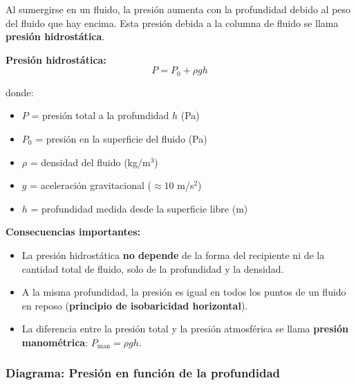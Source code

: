 \begin{seccion}
Al sumergirse en un fluido, la presión aumenta con la profundidad debido al peso del fluido que hay encima. Esta presión debida a la columna de fluido se llama \textbf{presión hidrostática}.

\begin{ecuacion}
\textbf{Presión hidrostática:}
$$P = P_0 + \rho g h$$

donde:
\begin{itemize}
    \item $P$ = presión total a la profundidad $h$ (Pa)
    \item $P_0$ = presión en la superficie del fluido (Pa)
    \item $\rho$ = densidad del fluido (kg/m$^3$)
    \item $g$ = aceleración gravitacional ($\approx 10$ m/s$^2$)
    \item $h$ = profundidad medida desde la superficie libre (m)
\end{itemize}
\end{ecuacion}

\textbf{Consecuencias importantes:}
\begin{itemize}
    \item La presión hidrostática \textbf{no depende} de la forma del recipiente ni de la cantidad total de fluido, solo de la profundidad y la densidad.
    \item A la misma profundidad, la presión es igual en todos los puntos de un fluido en reposo (\textbf{principio de isobaricidad horizontal}).
    \item La diferencia entre la presión total y la presión atmosférica se llama \textbf{presión manométrica}: $P_{\text{man}} = \rho g h$.
\end{itemize}
\end{seccion}

\subsubsection{Diagrama: Presión en función de la profundidad}

